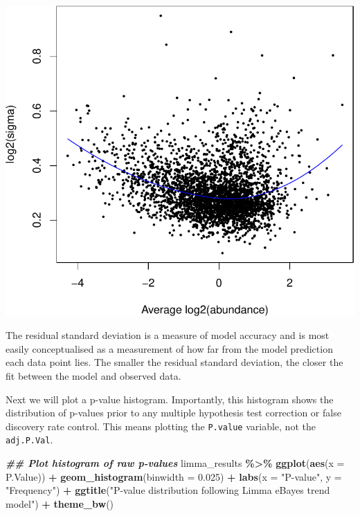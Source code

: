 \documentclass[9pt,a4paper,]{extarticle}
\newenvironment{Shaded}{\begin{snugshade}}{\end{snugshade}}
\newcommand{\AttributeTok}[1]{\textcolor[rgb]{0.13,0.29,0.53}{#1}}
\newcommand{\DocumentationTok}[1]{\textcolor[rgb]{0.56,0.35,0.01}{\textbf{\textit{#1}}}}
\newcommand{\FloatTok}[1]{\textcolor[rgb]{0.00,0.00,0.81}{#1}}
\newcommand{\FunctionTok}[1]{\textcolor[rgb]{0.13,0.29,0.53}{\textbf{#1}}}
\newcommand{\NormalTok}[1]{#1}
\newcommand{\SpecialCharTok}[1]{\textcolor[rgb]{0.81,0.36,0.00}{\textbf{#1}}}
\newcommand{\StringTok}[1]{\textcolor[rgb]{0.31,0.60,0.02}{#1}}
\begin{document}
\begin{center}\includegraphics[height=0.3\textheight]{workflow_expressions_files/figure-latex/plotSA-1} \end{center}

The residual standard deviation is a measure of model accuracy and is most
easily conceptualised as a measurement of how far from the model prediction each
data point lies. The smaller the residual standard deviation, the closer the fit
between the model and observed data.

Next we will plot a p-value histogram. Importantly, this histogram shows the
distribution of p-values prior to any multiple hypothesis test correction or
false discovery rate control. This means plotting the \texttt{P.value} variable, not
the \texttt{adj.P.Val}.

\begin{Shaded}
\begin{Highlighting}[]
\DocumentationTok{\#\# Plot histogram of raw p{-}values}
\NormalTok{limma\_results }\SpecialCharTok{\%\textgreater{}\%}
  \FunctionTok{ggplot}\NormalTok{(}\FunctionTok{aes}\NormalTok{(}\AttributeTok{x =}\NormalTok{ P.Value)) }\SpecialCharTok{+}
  \FunctionTok{geom\_histogram}\NormalTok{(}\AttributeTok{binwidth =} \FloatTok{0.025}\NormalTok{) }\SpecialCharTok{+}
  \FunctionTok{labs}\NormalTok{(}\AttributeTok{x =} \StringTok{"P{-}value"}\NormalTok{, }\AttributeTok{y =} \StringTok{"Frequency"}\NormalTok{) }\SpecialCharTok{+}
  \FunctionTok{ggtitle}\NormalTok{(}\StringTok{"P{-}value distribution following Limma eBayes trend model"}\NormalTok{) }\SpecialCharTok{+}
  \FunctionTok{theme\_bw}\NormalTok{()}
\end{Highlighting}
\end{Shaded}
\end{document}
